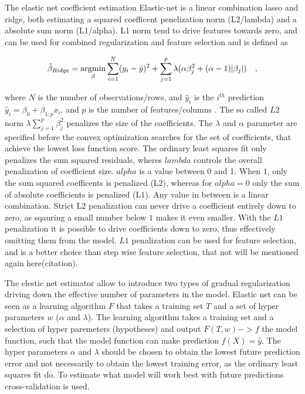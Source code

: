 The elastic net coefficient estimation Elastic-net is a linear combination lasso and ridge, both estimating a squared coefficent penelization norm (L2/lambda) and a absolute sum norm (L1/alpha). L1 norm tend to drive features towards zero, and can be used for combined regularization and feature selection and is defined as 

\begin{equation}
\hat{\beta}_{Ridge}  = 	\underset{\beta}{\operatorname*{\arg\!\min}} 
\sum_{i=1}^{N} (y_i - \hat{y})^2 + 
\sum_{j=1}^{p} \lambda(
	 \alpha       \beta_j^2 + 
    (\alpha -1) | \beta_j |
) \quad ,
\end{equation}

where $N$ is the number of observations/rows, and $\hat{y}_i$ is the $i^{th}$ prediction $\hat{y}_i = \beta_0 + \beta_{1:p} x_i.$ and $p$ is the number of features/columns \cite{friedman2001elements}. The so called $L2$ norm $\lambda \sum_{j=1}^{p} \beta_j^2$ penalizes the size of the coefficients. The $\lambda$ and $\alpha$ parameter are specified before the convex optimization searches for the set of coefficients, that achieve the lowest loss function score. The ordinary least squares fit only penalizes the sum squared residuals, wheres $lambda$ controls the overall penalization of coefficient size. $alpha$ is a value between 0 and 1. When $1$, only the sum squared coefficents is penalized (L2), whereas for $alpha=0$ only the sum of absolute coefficients is penalized (L1). Any value in between is a linear combination. Strict L2 penalization can never drive a coefficient entirely down to zero, as sqauring a small number below $1$ makes it even smaller. With the $L1$ penalization it is possible to drive coefficients down to zero, thus effectively omitting them from the model. $L1$ penalization can be used for feature selection, and is a better choice than step wise feature selection, that not will be mentioned again here(citation).

The elestic net estimator allow to introduce two types of gradual regularization driving down the effective number of parameters in the model. Elastic net can be seen as a learning algorithm $F$ that takes a training set $T$ and a set of hyper parameters $w$ ($\alpha$ and $\lambda$). The learning algorithm takes a training set and a selection of hyper paremeters (hypotheses) and output $F(T,w)->f$ the model function, such that the model function can make prediction $f(X)=\hat{y}$. The hyper parameters $\alpha$ and $\lambda$ should be chosen to obtain the lowest future prediction error and not necessarily to obtain the lowest training error, as the ordinary least squares fit do. To estimate what model will work best with future predictions cross-validation is used.

